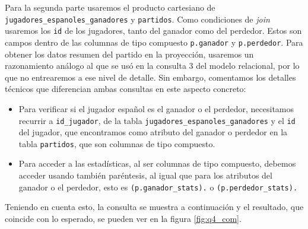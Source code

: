 Para la segunda parte usaremos el producto cartesiano de \texttt{jugadores\_espanoles\_ganadores} y \texttt{partidos}. Como condiciones de \textit{join} usaremos los \texttt{id} de los jugadores, tanto del ganador como del perdedor. Estos son campos dentro de las columnas de tipo compuesto \texttt{p.ganador} y \texttt{p.perdedor}. Para obtener los datos resumen del partido en la proyección, usaremos un razonamiento análogo al que se usó en la consulta 3 del modelo relacional, por lo que no entrearemos a ese nivel de detalle. Sin embargo, comentamos los detalles técnicos que diferencian ambas consultas en este aspecto concreto: 
\begin{itemize}
\item Para verificar si el jugador español es el ganador o el perdedor, necesitamos recurrir a \texttt{id\_jugador}, de la tabla \texttt{jugadores\_espanoles\_ganadores} y el \texttt{id} del jugador, que encontramos como atributo del ganador o perdedor en la tabla \texttt{partidos}, que son columnas de tipo compuesto. 
\item Para acceder a las estadísticas, al ser columnas de tipo compuesto, debemos acceder usando también paréntesis, al igual que para los atributos del ganador o el perdedor, esto es \texttt{(p.ganador\_stats).} o \texttt{(p.perdedor\_stats).}
\end{itemize}

Teniendo en cuenta esto, la consulta se muestra a continuación y el resultado, que coincide con lo esperado, se pueden ver en la figura \ref{fig:q4_com}.

